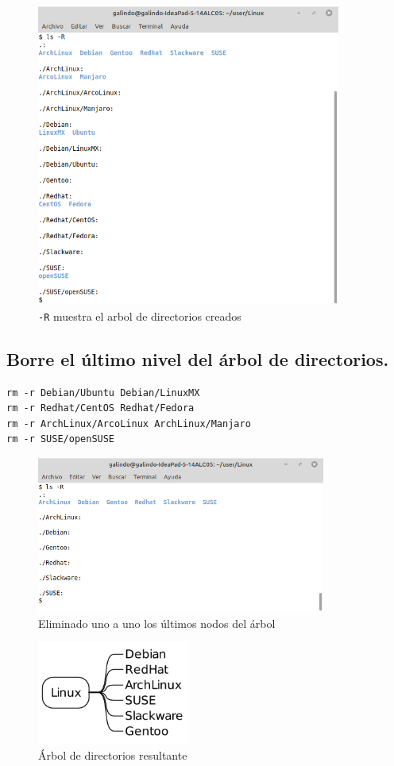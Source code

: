 \documentclass[11pt]{article}
\begin{document}
\begin{figure}[htbp]
\centering
\includegraphics[width=10cm]{img/6b.png}
\caption[\texttt{-R}]{\texttt{-R} muestra el arbol de directorios creados}
\end{figure}

\subsection{Borre el último nivel del árbol de directorios.}
\label{sec:org4a289af}
\begin{verbatim}
rm -r Debian/Ubuntu Debian/LinuxMX
rm -r Redhat/CentOS Redhat/Fedora
rm -r ArchLinux/ArcoLinux ArchLinux/Manjaro
rm -r SUSE/openSUSE
\end{verbatim}

\begin{figure}[htbp]
\centering
\includegraphics[width=9.5cm]{img/7.png}
\caption{Eliminado uno a uno los últimos nodos del árbol}
\end{figure}

\begin{figure}[htbp]
\centering
\includegraphics[width=5cm]{./img/tree2.png}
\caption{Árbol de directorios resultante}
\end{figure}
\end{document}
